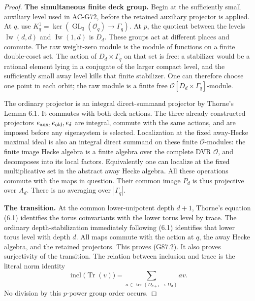\begin{proof}
\noindent\textbf{The simultaneous finite deck group.}
Begin at the sufficiently small auxiliary level used in AC-G72,
before the retained auxiliary projector is applied.
At \(q\), use \(K_q^1=\ker(\operatorname{GL}_3(\mathcal O_q)
\to\Gamma_q)\).
At \(p\), the quotient between the levels
\(\operatorname{Iw}(d,d)\) and \(\operatorname{Iw}(1,d)\)
is \(D_d\).
These groups act at different places and commute.
The raw weight-zero module is the module of functions on a finite
double-coset set.  The action of \(D_d\times\Gamma_q\) on that set
is free: a stabilizer would be a rational element lying in a conjugate
of the larger compact level, and the sufficiently small away level
kills that finite stabilizer.
One can therefore choose one point in each orbit; the raw module is
a finite free \(\mathcal O[D_d\times\Gamma_q]\)-module.

The ordinary projector is an integral direct-summand projector by
Thorne's Lemma 6.1.  It commutes with both deck actions.
The three already constructed projectors
\(e_{\rm aux},e_{\rm old},e_\delta\) are integral, commute with the
same actions, and are imposed before any eigensystem is selected.
Localization at the fixed away-Hecke maximal ideal is also an
integral direct summand on these finite \(\mathcal O\)-modules:
the finite image Hecke algebra is a finite algebra over the complete
DVR \(\mathcal O\), and decomposes into its local factors.
Equivalently one can localize at the fixed multiplicative set in
the abstract away Hecke algebra.
All these operations commute with the maps in question.
Their common image \(P_d\) is thus projective over \(A_d\).
There is no averaging over \(|\Gamma_q|\).

\noindent\textbf{The transition.}
At the common lower-unipotent depth \(d+1\), Thorne's equation (6.1)
identifies the torus coinvariants with the lower torus level by trace.
The ordinary depth-stabilization immediately following (6.1) identifies
that lower torus level with depth \(d\).
All maps commute with the action at \(q\), the away Hecke algebra,
and the retained projectors.
This proves (G87.2).  It also proves surjectivity of the transition.
The relation between inclusion and trace is the literal norm identity
\[
 \operatorname{incl}\bigl(\operatorname{Tr}(v)\bigr)
   =\sum_{a\in\ker(D_{d+1}\to D_d)}a v.
 \tag{G87.5}
\]
No division by this \(p\)-power group order occurs.


\end{proof}
